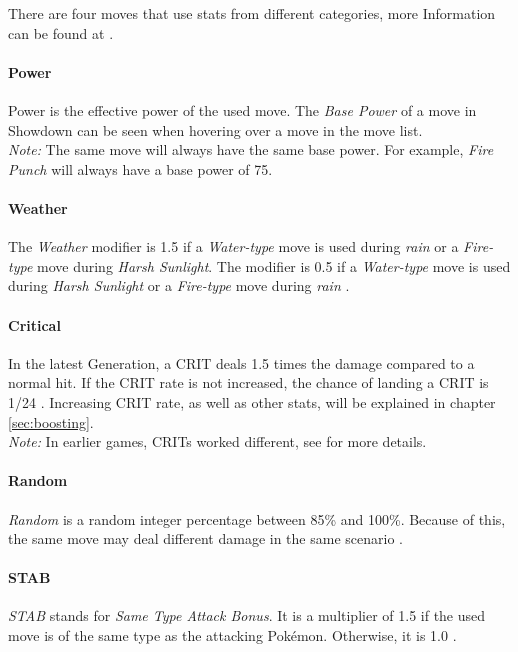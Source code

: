 There are four moves that use stats from different categories, more Information can be found
at \cite{Bulbapedia:MoveStatDifferentCategories}.

\paragraph{Power}
Power is the effective power of the used move.
The \textit{Base Power} of a move in Showdown can be seen when hovering over a move in the move list. \\
\textit{Note:} The same move will always have the same base power. For example, \textit{Fire Punch} will
always have a base power of 75\cite{Bulbapedia:FirePunch}.

\paragraph{Weather}
The \textit{Weather} modifier is 1.5 if a \textit{Water-type} move is used during \textit{rain} or a 
\textit{Fire-type} move during \textit{Harsh Sunlight}. The modifier is 0.5 if a \textit{Water-type} move
is used during \textit{Harsh Sunlight} or a \textit{Fire-type} move during \textit{rain} \cite{Bulbapedia:Damage}.

\paragraph{Critical}
In the latest Generation, a \ac{CRIT} deals 1.5 times the damage compared to a normal hit.
If the \ac{CRIT} rate is not increased, the chance of landing a \ac{CRIT} is 1/24
\cite{Bulbapedia:CriticalHit}. Increasing \ac{CRIT} rate, as well as other stats, will 
be explained in chapter \ref{sec:boosting}. \\
\textit{Note:} In earlier games, \ac{CRIT}s worked different, see \cite{Bulbapedia:CriticalHit} for
more details.

\paragraph{Random}
\textit{Random} is a random integer percentage between 85\% and 100\%. Because of this, the same move
may deal different damage in the same scenario \cite{Bulbapedia:Damage}.

\paragraph{STAB}
\textit{STAB} stands for \textit{Same Type Attack Bonus}. It is a multiplier of 1.5 if the used move
is of the same type as the attacking Pokémon. Otherwise, it is 1.0 \cite{Bulbapedia:Damage}.

